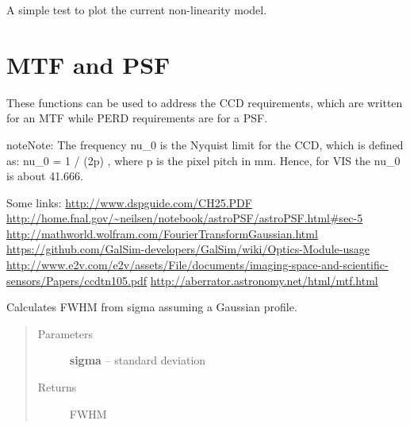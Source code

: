 \documentclass[a4paper,11pt,english]{sphinxmanual}
\begin{document}

\begin{fulllineitems}
\label{instrument:support.VISinstrumentModel.testNonLinearity}
A simple test to plot the current non-linearity model.

\end{fulllineitems}

\label{instrument:module-sandbox.MTF}

\section{MTF and PSF}
\label{instrument:mtf-and-psf}
These functions can be used to address the CCD requirements, which are written for an MTF
while PERD requirements are for a PSF.

\begin{notice}{note}{Note:}
The frequency nu\_0 is the Nyquist limit for the CCD, which is defined as:
nu\_0 = 1 / (2p) ,
where p is the pixel pitch in mm. Hence, for VIS the nu\_0 is about 41.666.
\end{notice}

Some links:
\href{http://www.dspguide.com/CH25.PDF}{http://www.dspguide.com/CH25.PDF}
\href{http://home.fnal.gov/~neilsen/notebook/astroPSF/astroPSF.html\#sec-5}{http://home.fnal.gov/\textasciitilde{}neilsen/notebook/astroPSF/astroPSF.html\#sec-5}
\href{http://mathworld.wolfram.com/FourierTransformGaussian.html}{http://mathworld.wolfram.com/FourierTransformGaussian.html}
\href{https://github.com/GalSim-developers/GalSim/wiki/Optics-Module-usage}{https://github.com/GalSim-developers/GalSim/wiki/Optics-Module-usage}
\href{http://www.e2v.com/e2v/assets/File/documents/imaging-space-and-scientific-sensors/Papers/ccdtn105.pdf}{http://www.e2v.com/e2v/assets/File/documents/imaging-space-and-scientific-sensors/Papers/ccdtn105.pdf}
\href{http://aberrator.astronomy.net/html/mtf.html}{http://aberrator.astronomy.net/html/mtf.html}

\begin{fulllineitems}
\label{instrument:sandbox.MTF.FWHM}
Calculates FWHM from sigma assuming a Gaussian profile.
\begin{quote}\begin{description}
\item[{Parameters}] \leavevmode
\textbf{sigma} -- standard deviation

\item[{Returns}] \leavevmode
FWHM

\end{description}\end{quote}

\end{fulllineitems}
\end{document}
